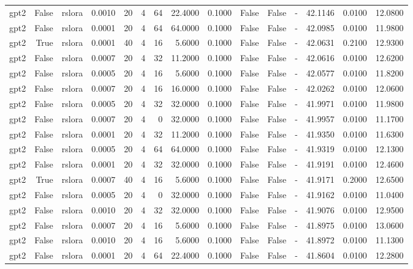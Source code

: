 \begin{tabular}{lrlrrrrrrlllrrr}
gpt2 & False & rslora & 0.0010 & 20 & 4 & 64 & 22.4000 & 0.1000 & False & False & - & 42.1146 & 0.0100 & 12.0800 \\
gpt2 & False & rslora & 0.0001 & 20 & 4 & 64 & 64.0000 & 0.1000 & False & False & - & 42.0985 & 0.0100 & 11.9800 \\
gpt2 & True & rslora & 0.0001 & 40 & 4 & 16 & 5.6000 & 0.1000 & False & False & - & 42.0631 & 0.2100 & 12.9300 \\
gpt2 & False & rslora & 0.0007 & 20 & 4 & 32 & 11.2000 & 0.1000 & False & False & - & 42.0616 & 0.0100 & 12.6200 \\
gpt2 & False & rslora & 0.0005 & 20 & 4 & 16 & 5.6000 & 0.1000 & False & False & - & 42.0577 & 0.0100 & 11.8200 \\
gpt2 & False & rslora & 0.0007 & 20 & 4 & 16 & 16.0000 & 0.1000 & False & False & - & 42.0262 & 0.0100 & 12.0600 \\
gpt2 & False & rslora & 0.0005 & 20 & 4 & 32 & 32.0000 & 0.1000 & False & False & - & 41.9971 & 0.0100 & 11.9800 \\
gpt2 & False & rslora & 0.0007 & 20 & 4 & 0 & 32.0000 & 0.1000 & False & False & - & 41.9957 & 0.0100 & 11.1700 \\
gpt2 & False & rslora & 0.0001 & 20 & 4 & 32 & 11.2000 & 0.1000 & False & False & - & 41.9350 & 0.0100 & 11.6300 \\
gpt2 & False & rslora & 0.0005 & 20 & 4 & 64 & 64.0000 & 0.1000 & False & False & - & 41.9319 & 0.0100 & 12.1300 \\
gpt2 & False & rslora & 0.0001 & 20 & 4 & 32 & 32.0000 & 0.1000 & False & False & - & 41.9191 & 0.0100 & 12.4600 \\
gpt2 & True & rslora & 0.0007 & 40 & 4 & 16 & 5.6000 & 0.1000 & False & False & - & 41.9171 & 0.2000 & 12.6500 \\
gpt2 & False & rslora & 0.0005 & 20 & 4 & 0 & 32.0000 & 0.1000 & False & False & - & 41.9162 & 0.0100 & 11.0400 \\
gpt2 & False & rslora & 0.0010 & 20 & 4 & 32 & 32.0000 & 0.1000 & False & False & - & 41.9076 & 0.0100 & 12.9500 \\
gpt2 & False & rslora & 0.0007 & 20 & 4 & 16 & 5.6000 & 0.1000 & False & False & - & 41.8975 & 0.0100 & 13.0600 \\
gpt2 & False & rslora & 0.0010 & 20 & 4 & 16 & 5.6000 & 0.1000 & False & False & - & 41.8972 & 0.0100 & 11.1300 \\
gpt2 & False & rslora & 0.0001 & 20 & 4 & 64 & 22.4000 & 0.1000 & False & False & - & 41.8604 & 0.0100 & 12.2800 \\

\end{tabular}
